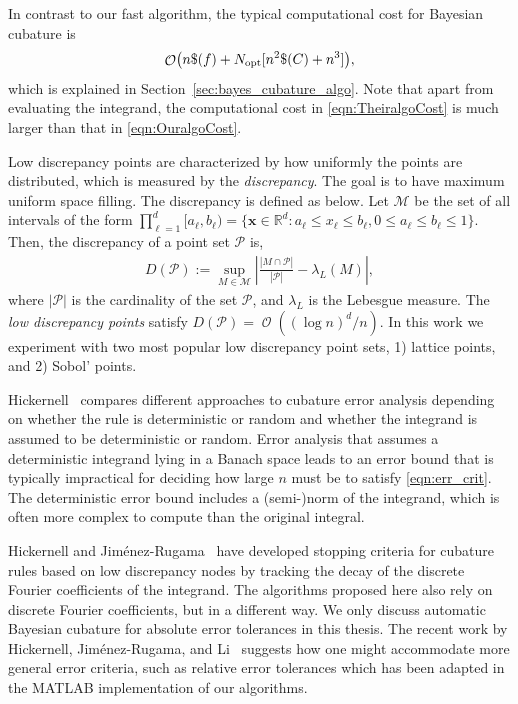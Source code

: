 \documentclass{iitthesis}          %
\DeclareMathOperator{\Order}{{\mathcal O}}
\newcommand{\bm}[1]{\boldsymbol{#1}}
\newcommand{\vx}{\bm{x}}
\newcommand{\opt}{\textup{opt}}
\def\abs#1{\ensuremath{\left \lvert #1 \right \rvert}}
\begin{document}
In contrast to our fast algorithm, the typical computational cost for Bayesian cubature is
\begin{equation} \label{eqn:TheiralgoCost}
\Order\bigl(n \$(f) + N_{\opt}[n^2\$(C) + n^3] \bigr),
\end{equation} 
which is explained in Section~\ref{sec:bayes_cubature_algo}. Note that apart from evaluating the integrand, the computational cost in \eqref{eqn:TheiralgoCost} is much larger than that in \eqref{eqn:OuralgoCost}.  




Low discrepancy points are characterized by how uniformly the points are distributed, which is measured by the \emph{discrepancy}. %
The goal is to have maximum uniform space filling. The discrepancy is defined as below.
Let $\mathcal{M}$ be the set of all intervals of the form $\prod_{\ell=1}^{d} [a_\ell, b_\ell) = \{ \vx \in \mathbb{R}^d : a_\ell \le x_\ell \le b_\ell, 0 \le a_\ell \le b_\ell \le 1 \}$. Then, the discrepancy of a point set $\mathcal{P}$ is,
\begin{align*}
D(\mathcal{P}) := \sup_{M \in \mathcal{M}} 
\abs{ \frac{\abs{M \cap \mathcal{P}}}{\abs{\mathcal{P}}} - \lambda_L(M) },
\end{align*}
where $\abs{\mathcal{P}}$ is the cardinality of the set $\mathcal{P}$, and $\lambda_L$ is the Lebesgue measure.
The \emph{low discrepancy points} satisfy $D(\mathcal{P}) = \Order((\log n)^d/n)$.
In this work we experiment with two most popular low discrepancy point sets, 1) lattice points, and 2) Sobol' points.


Hickernell~\cite{Hic17a} compares different approaches to cubature error analysis depending on whether the rule is deterministic or random and whether the integrand is assumed to be deterministic or random.  Error analysis that assumes a deterministic integrand lying in a Banach space leads to an error bound that is typically impractical for deciding how large $n$ must be to satisfy \eqref{eqn:err_crit}.  The deterministic error bound includes a (semi-)norm of the integrand, which is often more complex to compute than the original integral.

Hickernell and Jim\'enez-Rugama~\cite{HicJim16a,JimHic16a} have developed stopping criteria for cubature rules based on low discrepancy nodes by tracking the decay of the discrete Fourier coefficients of the integrand.  The algorithms proposed here also rely on discrete Fourier coefficients, but in a different way.  We only discuss automatic Bayesian cubature for absolute error tolerances in this thesis. The recent work by Hickernell, Jim\'enez-Rugama, and Li~\cite{HicEtal17a} suggests how one might accommodate more general error criteria, such as relative error tolerances which has been adapted in the MATLAB implementation of our algorithms.
\end{document}
